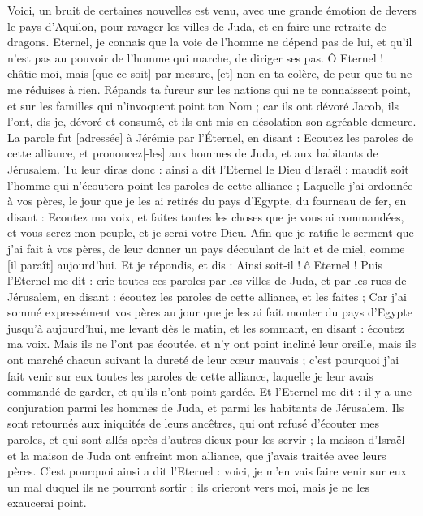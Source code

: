 \begin{multicols}{2}
Voici, un bruit de certaines nouvelles est venu, avec une grande émotion de devers le pays d'Aquilon, pour ravager les villes de Juda, et en faire une retraite de dragons.
Eternel, je connais que la voie de l'homme ne dépend pas de lui, et qu'il n'est pas au pouvoir de l'homme qui marche, de diriger ses pas.
Ô Eternel ! châtie-moi, mais [que ce soit] par mesure, [et] non en ta colère, de peur que tu ne me réduises à rien.
Répands ta fureur sur les nations qui ne te connaissent point, et sur les familles qui n'invoquent point ton Nom ; car ils ont dévoré Jacob, ils l'ont, dis-je, dévoré et consumé, et ils ont mis en désolation son agréable demeure.
\VerseOne{}La parole fut [adressée] à Jérémie par l'Éternel, en disant :
Ecoutez les paroles de cette alliance, et prononcez[-les] aux hommes de Juda, et aux habitants de Jérusalem.
Tu leur diras donc : ainsi a dit l'Eternel le Dieu d'Israël : maudit soit l'homme qui n'écoutera point les paroles de cette alliance ;
Laquelle j'ai ordonnée à vos pères, le jour que je les ai retirés du pays d'Egypte, du fourneau de fer, en disant : Ecoutez ma voix, et faites toutes les choses que je vous ai commandées, et vous serez mon peuple, et je serai votre Dieu.
Afin que je ratifie le serment que j'ai fait à vos pères, de leur donner un pays découlant de lait et de miel, comme [il paraît] aujourd'hui. Et je répondis, et dis : Ainsi soit-il ! ô Eternel !
Puis l'Eternel me dit : crie toutes ces paroles par les villes de Juda, et par les rues de Jérusalem, en disant : écoutez les paroles de cette alliance, et les faites ;
Car j'ai sommé expressément vos pères au jour que je les ai fait monter du pays d'Egypte jusqu’à aujourd'hui, me levant dès le matin, et les sommant, en disant : écoutez ma voix.
Mais ils ne l'ont pas écoutée, et n'y ont point incliné leur oreille, mais ils ont marché chacun suivant la dureté de leur cœur mauvais ; c'est pourquoi j'ai fait venir sur eux toutes les paroles de cette alliance, laquelle je leur avais commandé de garder, et qu'ils n'ont point gardée.
Et l'Eternel me dit : il y a une conjuration parmi les hommes de Juda, et parmi les habitants de Jérusalem.
Ils sont retournés aux iniquités de leurs ancêtres, qui ont refusé d'écouter mes paroles, et qui sont allés après d'autres dieux pour les servir ; la maison d'Israël et la maison de Juda ont enfreint mon alliance, que j'avais traitée avec leurs pères.
C'est pourquoi ainsi a dit l'Eternel : voici, je m'en vais faire venir sur eux un mal duquel ils ne pourront sortir ; ils crieront vers moi, mais je ne les exaucerai point.

\end{multicols}
